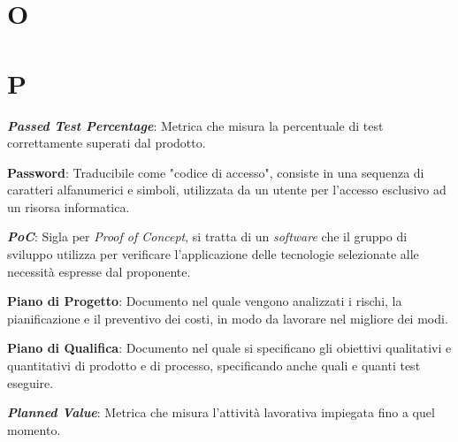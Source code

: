 \documentclass[5pt]{article}
\begin{document}
\pagebreak

\section*{O}
\begin{flushleft}
	
\end{flushleft}

\pagebreak

\section*{P}
\begin{flushleft}
	
\textbf{\textit{Passed Test Percentage}}: Metrica che misura la percentuale di test correttamente superati dal prodotto.\newline

\textbf{Password}: Traducibile come "codice di accesso", consiste in una sequenza di caratteri alfanumerici e simboli, utilizzata da un utente per l'accesso esclusivo ad un risorsa informatica. \newline

\textbf{\textit{PoC}}: Sigla per \textit{Proof of Concept}, si tratta di un \textit{software} che il gruppo di sviluppo utilizza per verificare l'applicazione delle tecnologie selezionate alle necessità espresse dal proponente.\newline

\textbf{Piano di Progetto}: Documento nel quale vengono analizzati i rischi, la pianificazione e il preventivo dei costi, in modo da lavorare nel migliore dei modi.\newline

\textbf{Piano di Qualifica}: Documento nel quale si specificano gli obiettivi qualitativi e quantitativi di prodotto e di processo, specificando anche quali e quanti test eseguire.\newline

\textbf{\textit{Planned Value}}: Metrica che misura l'attività lavorativa impiegata fino a quel momento.\newline


\end{flushleft}
\end{document}
